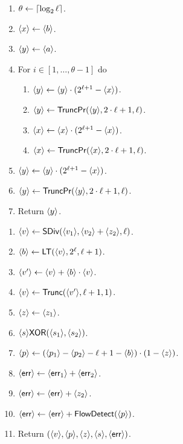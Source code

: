   \begin{enumerate}
    \item $\theta \leftarrow {\lceil \log_{2} \ell \rceil}$.
    \item $\langle x \rangle \leftarrow \langle b \rangle$.
    \item $\langle y \rangle \leftarrow \langle a \rangle$.
    \item For $i \in [1,\ldots,\theta-1]$ do
          \begin{enumerate}
            \item $\langle y \rangle \leftarrow \langle y \rangle \cdot (2^{\ell+1}-\langle x \rangle)$.
            \item $\langle y \rangle \leftarrow \mathsf{TruncPr}(\langle y \rangle,2\cdot \ell+1,\ell)$.
            \item $\langle x \rangle \leftarrow \langle x \rangle \cdot (2^{\ell+1}-\langle x \rangle)$.
            \item $\langle x \rangle \leftarrow \mathsf{TruncPr}(\langle x \rangle,2\cdot \ell+1,\ell)$.
          \end{enumerate}
    \item $\langle y \rangle \leftarrow \langle y \rangle \cdot (2^{\ell+1}-\langle x \rangle)$.
    \item $\langle y \rangle \leftarrow \mathsf{TruncPr}(\langle y \rangle,2\cdot \ell+1,\ell)$.
    \item Return $\langle y \rangle$.
  \end{enumerate}

\begin{enumerate}
  \item $\langle v \rangle \leftarrow \mathsf{SDiv}(\langle v_1 \rangle,\langle v_2 \rangle+\langle z_2 \rangle,\ell)$.
  \item $\langle b \rangle \leftarrow \mathsf{LT}(\langle v \rangle,2^\ell,\ell+1)$.
  \item $\langle v' \rangle \leftarrow \langle v \rangle+\langle b \rangle \cdot \langle v \rangle$.
  \item $\langle v \rangle \leftarrow \mathsf{Trunc}(\langle v' \rangle, \ell+1, 1)$.
  \item $\langle z \rangle \leftarrow \langle z_1 \rangle$.
  \item $\langle s \rangle \mathsf{XOR}(\langle s_1 \rangle,\langle s_2 \rangle)$.
  \item $\langle p \rangle \leftarrow (\langle p_1 \rangle-\langle p_2 \rangle-\ell+1-\langle b \rangle) \cdot (1-\langle z \rangle)$.
  \item $\langle \mathsf{err} \rangle \leftarrow \langle \mathsf{err}_1 \rangle + \langle \mathsf{err}_2 \rangle$.
  \item $\langle \mathsf{err} \rangle \leftarrow \langle \mathsf{err} \rangle + \langle z_2 \rangle$.
  \item $\langle \mathsf{err} \rangle \leftarrow \langle \mathsf{err} \rangle + \mathsf{FlowDetect}(\langle p \rangle)$.
  \item Return $(\langle v \rangle,\langle p \rangle,\langle z \rangle,\langle s \rangle,\langle \mathsf{err} \rangle)$.
\end{enumerate}


